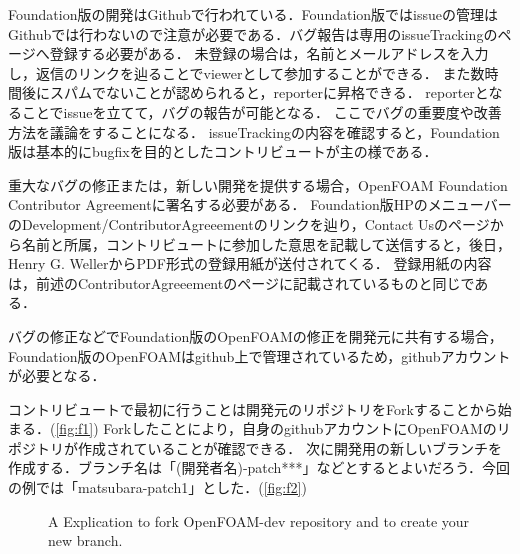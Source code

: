 \documentclass{ltjoc}
\begin{document}
Foundation版の開発はGithubで行われている．Foundation版ではissueの管理はGithubでは行わないので注意が必要である．バグ報告は専用のissueTrackingのページへ登録する必要がある．
未登録の場合は，名前とメールアドレスを入力し，返信のリンクを辿ることでviewerとして参加することができる．
また数時間後にスパムでないことが認められると，reporterに昇格できる．
reporterとなることでissueを立てて，バグの報告が可能となる．
ここでバグの重要度や改善方法を議論をすることになる．
issueTrackingの内容を確認すると，Foundation版は基本的にbugfixを目的としたコントリビュートが主の様である．

重大なバグの修正または，新しい開発を提供する場合，OpenFOAM Foundation Contributor Agreementに署名する必要がある．
Foundation版HPのメニューバーのDevelopment/ContributorAgreeementのリンクを辿り，Contact Usのページから名前と所属，コントリビュートに参加した意思を記載して送信すると，後日，Henry G. WellerからPDF形式の登録用紙が送付されてくる．
登録用紙の内容は，前述のContributorAgreeementのページに記載されているものと同じである．

バグの修正などでFoundation版のOpenFOAMの修正を開発元に共有する場合，Foundation版のOpenFOAMはgithub上で管理されているため，githubアカウントが必要となる．

コントリビュートで最初に行うことは開発元のリポジトリをForkすることから始まる．(\autoref{fig:f1})
Forkしたことにより，自身のgithubアカウントにOpenFOAMのリポジトリが作成されていることが確認できる．
次に開発用の新しいブランチを作成する．ブランチ名は「(開発者名)-patch***」などとするとよいだろう．今回の例では「matsubara-patch1」とした．(\autoref{fig:f2})

\begin{figure}[htbp]
\centering
{}
\caption{A Explication to fork OpenFOAM-dev repository and to create your new branch.}
\label{fig:f1f2}
\end{figure}
\end{document}
